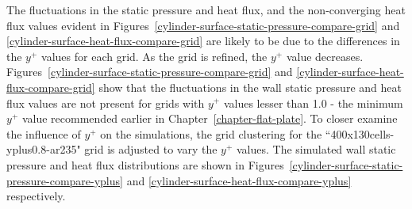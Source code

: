 The fluctuations in the static pressure and heat flux, and the non-converging heat 
flux values evident in Figures~\ref{cylinder-surface-static-pressure-compare-grid} and 
\ref{cylinder-surface-heat-flux-compare-grid} are likely to be due to the differences in 
the $y^+$ values for each grid. As the grid is refined, the $y^+$ value decreases.
Figures~\ref{cylinder-surface-static-pressure-compare-grid} and \ref{cylinder-surface-heat-flux-compare-grid} 
show that the fluctuations in the wall static pressure and heat flux values are not present for 
grids with $y^+$ values lesser than 1.0 - the minimum $y^+$ value recommended earlier 
in Chapter~\ref{chapter-flat-plate}. To closer examine the influence of $y^+$ on the 
simulations, the grid clustering for the ``400x130cells-yplus0.8-ar235" grid is 
adjusted to vary the $y^+$ values. The simulated wall static pressure and heat flux 
distributions are shown in Figures~\ref{cylinder-surface-static-pressure-compare-yplus}
and \ref{cylinder-surface-heat-flux-compare-yplus} respectively.
%

